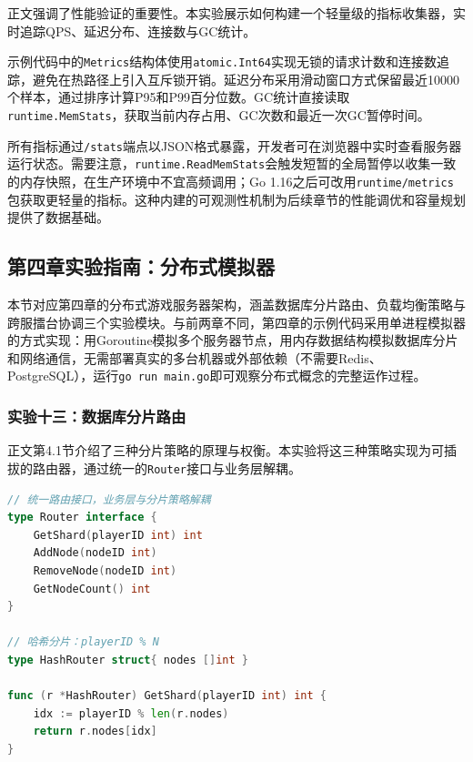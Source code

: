 正文强调了性能验证的重要性。本实验展示如何构建一个轻量级的指标收集器，实时追踪QPS、延迟分布、连接数与GC统计。

示例代码中的\texttt{Metrics}结构体使用\texttt{atomic.Int64}实现无锁的请求计数和连接数追踪，避免在热路径上引入互斥锁开销。延迟分布采用滑动窗口方式保留最近10000个样本，通过排序计算P95和P99百分位数。GC统计直接读取\texttt{runtime.MemStats}，获取当前内存占用、GC次数和最近一次GC暂停时间。

所有指标通过\texttt{/stats}端点以JSON格式暴露，开发者可在浏览器中实时查看服务器运行状态。需要注意，\texttt{runtime.ReadMemStats}会触发短暂的全局暂停以收集一致的内存快照，在生产环境中不宜高频调用；Go 1.16之后可改用\texttt{runtime/metrics}包获取更轻量的指标。这种内建的可观测性机制为后续章节的性能调优和容量规划提供了数据基础。

\subsection{第四章实验指南：分布式模拟器}

本节对应第四章的分布式游戏服务器架构，涵盖数据库分片路由、负载均衡策略与跨服擂台协调三个实验模块。与前两章不同，第四章的示例代码采用单进程模拟器的方式实现：用Goroutine模拟多个服务器节点，用内存数据结构模拟数据库分片和网络通信，无需部署真实的多台机器或外部依赖（不需要Redis、PostgreSQL），运行\texttt{go run main.go}即可观察分布式概念的完整运作过程。

\subsubsection{实验十三：数据库分片路由}

正文第4.1节介绍了三种分片策略的原理与权衡。本实验将这三种策略实现为可插拔的路由器，通过统一的\texttt{Router}接口与业务层解耦。

\begin{tcolorbox}[title=分片路由接口与哈希分片]
\begin{lstlisting}[style=codeblock, language=go]
// 统一路由接口，业务层与分片策略解耦
type Router interface {
    GetShard(playerID int) int
    AddNode(nodeID int)
    RemoveNode(nodeID int)
    GetNodeCount() int
}

// 哈希分片：playerID % N
type HashRouter struct{ nodes []int }

func (r *HashRouter) GetShard(playerID int) int {
    idx := playerID % len(r.nodes)
    return r.nodes[idx]
}
\end{lstlisting}
\end{tcolorbox}

